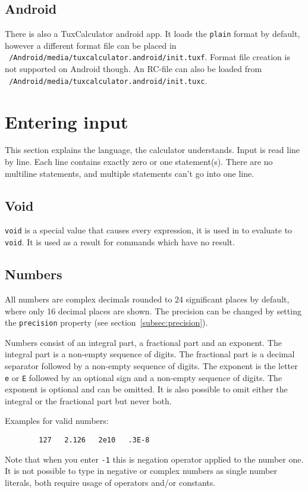 \documentclass[10pt]{article}
\let\~=\allowbreak
\begin{document}
    \subsection{Android}
    There is also a TuxCalculator android app.
    It loads the \verb|plain| format by default, however a different format file can be placed in \texttt{\string~/Android\~/media\~/tuxcalculator.android\~/init.tuxf}.
    Format file creation is not supported on Android though.
    An RC-file can also be loaded from \texttt{\string~/Android\~/media\~/tuxcalculator.android\~/init.tuxc}.
    
    \section{Entering input}\label{sec:entering-input}
    This section explains the language, the calculator understands.
    Input is read line by line.
    Each line contains exactly zero or one statement{\small(s)}.
    There are no multiline statements, and multiple statements can't go into one line.
    
    \subsection{Void}\label{subsec:void}
    \verb|void| is a special value that causes every expression, it is used in to evaluate to \verb|void|.
    It is used as a result for commands which have no result.
    
    \subsection{Numbers}\label{subsec:numbers}
    All numbers are complex decimals rounded to 24 significant places by default, where only 16 decimal places are shown.
    The precision can be changed by setting the \verb|precision| property (see section~\ref{subsec:precision}).
    
    Numbers consist of an integral part, a fractional part and an exponent.
    The integral part is a non-empty sequence of digits.
    The fractional part is a decimal separator followed by a non-empty sequence of digits.
    The exponent is the letter \verb|e| or \verb|E| followed by an optional sign and a non-empty sequence of digits.
    The exponent is optional and can be omitted.
    It is also possible to omit either the integral or the fractional part but never both.
    
    Examples for valid numbers:
    \begin{verbatim}
        127   2.126   2e10   .3E-8
    \end{verbatim}
    Note that when you enter \verb|-1| this is negation operator applied to the number one.
    It is not possible to type in negative or complex numbers as single number literals, both require usage of operators and/or constants.
    
\end{document}
